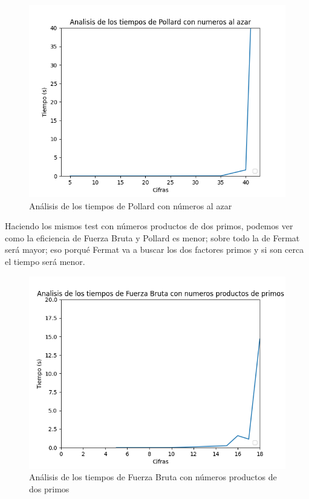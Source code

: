 \documentclass{article}
\begin{document}
    
    \begin{figure}[ht!]
        \centering
        \includegraphics[scale=0.3]{Figure_5}
        \caption{Análisis de los tiempos de Pollard con números al azar}
        \label{fig:Figure_5}
    \end{figure}
    
    
    \newpage
    
    
    Haciendo los mismos test con números productos de dos primos, podemos ver como la eficiencia de Fuerza Bruta y Pollard es menor; sobre todo la de Fermat será mayor; eso porqué Fermat va a buscar los dos factores primos y si son cerca el tiempo será menor.
    
    \begin{figure}[ht!]
        \centering
        \includegraphics[scale=0.3]{Figure_2}
        \caption{Análisis de los tiempos de Fuerza Bruta con números productos de dos primos}
        \label{fig:Figure_2}
    \end{figure}
    
\end{document}
